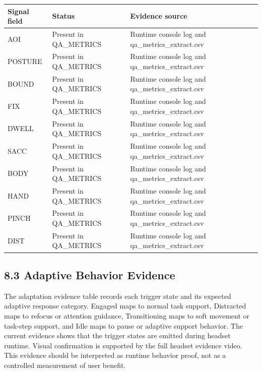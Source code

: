 \documentclass[
  10pt,
]{article}
\newcounter{none} %
\begin{document}
{\def\LTcaptype{none} %
\begin{longtable}[]{@{}
  >{\raggedright\arraybackslash}p{}
  >{\raggedright\arraybackslash}p{}
  >{\raggedright\arraybackslash}p{}@{}}
\toprule\noalign{}
\begin{minipage}[b]{\linewidth}\raggedright
Signal field
\end{minipage} & \begin{minipage}[b]{\linewidth}\raggedright
Status
\end{minipage} & \begin{minipage}[b]{\linewidth}\raggedright
Evidence source
\end{minipage} \\
\midrule\noalign{}
\endhead
\bottomrule\noalign{}
\endlastfoot
AOI & Present in QA\_METRICS & Runtime console log and
qa\_metrics\_extract.csv \\
POSTURE & Present in QA\_METRICS & Runtime console log and
qa\_metrics\_extract.csv \\
BOUND & Present in QA\_METRICS & Runtime console log and
qa\_metrics\_extract.csv \\
FIX & Present in QA\_METRICS & Runtime console log and
qa\_metrics\_extract.csv \\
DWELL & Present in QA\_METRICS & Runtime console log and
qa\_metrics\_extract.csv \\
SACC & Present in QA\_METRICS & Runtime console log and
qa\_metrics\_extract.csv \\
BODY & Present in QA\_METRICS & Runtime console log and
qa\_metrics\_extract.csv \\
HAND & Present in QA\_METRICS & Runtime console log and
qa\_metrics\_extract.csv \\
PINCH & Present in QA\_METRICS & Runtime console log and
qa\_metrics\_extract.csv \\
DIST & Present in QA\_METRICS & Runtime console log and
qa\_metrics\_extract.csv \\
\end{longtable}
}

\subsection{8.3 Adaptive Behavior
Evidence}\label{adaptive-behavior-evidence}

The adaptation evidence table records each trigger state and its
expected adaptive response category. Engaged maps to normal task
support, Distracted maps to refocus or attention guidance, Transitioning
maps to soft movement or task-step support, and Idle maps to pause or
adaptive support behavior. The current evidence shows that the trigger
states are emitted during headset runtime. Visual confirmation is
supported by the full headset evidence video. This evidence should be
interpreted as runtime behavior proof, not as a controlled measurement
of user benefit.
\end{document}
